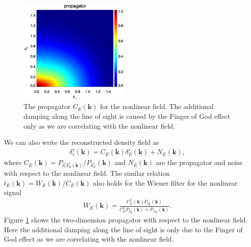 \documentclass[aps,prx,twocolumn,superscriptaddress,groupedaddress,nofootinbib,amsfont]{revtex4}  %
\newcommand{\bea}{\begin{eqnarray}}
\newcommand{\eea}{\end{eqnarray}}
\newcommand{\bmk}{\bm{k}}
\begin{document}
\begin{figure}[tbp]
\begin{center}
\includegraphics[width=0.48\textwidth]{0.000transf-the_deltaRsxEs_4x.eps}
\end{center}
\vspace{-0.7cm}
\caption{The propagator $C_E(\bmk)$ for the nonlinear field. The additional 
damping along the line of sight is caused by the Finger of God effect only as 
we are correlating with the nonlinear field.}
\label{fig:tf_Es}
\end{figure}

We can also write the reconstructed density field as 
\bea
\delta_r^s(\bmk)=C_E(\bmk)\delta_E^s(\bmk)+N_E(\bmk),
\eea
where $C_E(\bmk)=P_{\delta_r^s\delta_E^s(\bmk)}/P_{\delta_E^s}(\bmk)$ and 
$N_E(\bmk)$ are the propagator and noise with respect to the nonlinear field.
The similar relation $t_E(\bmk)={W_E(\bmk)}/{C_E(\bmk)}$ also holds for the 
Wiener filter for the nonlinear signal 
\bea
W_E(\bmk)=\frac{C^2_E(\bmk)P_{\delta_E^s}(\bmk)}{C_E^2P_{\delta^s_E}(\bmk)+P_{N_E}(\bmk)}.
\eea
Figure \ref{fig:tf_Es} shows the two-dimension propagator with respect to the
nonlinear field. Here the additional damping along the line of sight is only
due to the Finger of God effect as we are correlating with the nonlinear field.
\end{document}
